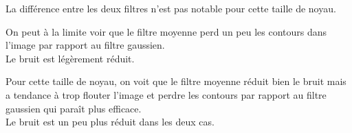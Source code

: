 \documentclass{article}
\begin{document}
\begin{enumerate}[label=\arabic*$\degres$)]
La différence entre les deux filtres n'est pas notable pour cette taille de noyau. 

On peut à la limite voir que le filtre moyenne perd un peu les contours dans l'image par rapport au filtre gaussien.\\

Le bruit est légèrement réduit.


Pour cette taille de noyau, on voit que le filtre moyenne réduit bien le bruit mais a tendance à trop flouter l'image et perdre les contours par rapport au filtre gaussien qui paraît plus efficace.\\

Le bruit est un peu plus réduit dans les deux cas.



\end{enumerate}
\end{document}
